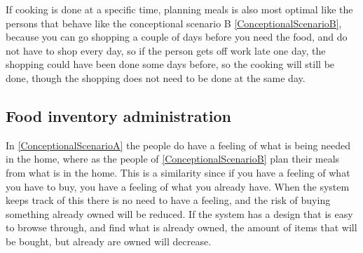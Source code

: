 If cooking is done at a specific time, planning meals is also most optimal like the persons that behave like the conceptional scenario B \ref{ConceptionalScenarioB}, because you can go shopping a couple of days before you need the food, and do not have to shop every day, so if the person gets off work late one day, the shopping could have been done some days before, so the cooking will still be done, though the shopping does not need to be done at the same day.

\subsection{Food inventory administration}

In \ref{ConceptionalScenarioA} the people do have a feeling of what is being needed in the home, where as the people of \ref{ConceptionalScenarioB} plan their meals from what is in the home. This is a similarity since if you have a feeling of what you have to buy, you have a feeling of what you already have. When the system keeps track of this there is no need to have a feeling, and the risk of buying something already owned will be reduced. If the system has a design that is easy to browse through, and find what is already owned, the amount of items that will be bought, but already are owned will decrease.